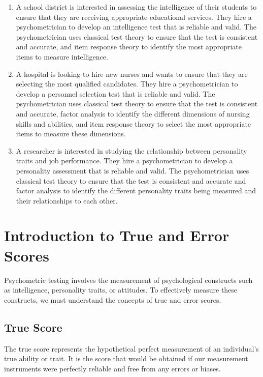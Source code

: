 \documentclass[12pt, a4paper]{exam}
\begin{document}
\begin{enumerate}
    \item A school district is interested in assessing the intelligence of their students to ensure that they are receiving appropriate educational services. They hire a psychometrician to develop an intelligence test that is reliable and valid. The psychometrician uses classical test theory to ensure that the test is consistent and accurate, and item response theory to identify the most appropriate items to measure intelligence.
    \item A hospital is looking to hire new nurses and wants to ensure that they are selecting the most qualified candidates. They hire a psychometrician to develop a personnel selection test that is reliable and valid. The psychometrician uses classical test theory to ensure that the test is consistent and accurate, factor analysis to identify the different dimensions of nursing skills and abilities, and item response theory to select the most appropriate items to measure these dimensions.
    \item A researcher is interested in studying the relationship between personality traits and job performance. They hire a psychometrician to develop a personality assessment that is reliable and valid. The psychometrician uses classical test theory to ensure that the test is consistent and accurate and factor analysis to identify the different personality traits being measured and their relationships to each other.
\end{enumerate}

\section{Introduction to True and Error Scores}

Psychometric testing involves the measurement of psychological constructs such as intelligence, personality traits, or attitudes. To effectively measure these constructs, we must understand the concepts of true and error scores.

\subsection{True Score}

The true score represents the hypothetical perfect measurement of an individual’s true ability or trait. It is the score that would be obtained if our measurement instruments were perfectly reliable and free from any errors or biases.
\end{document}
